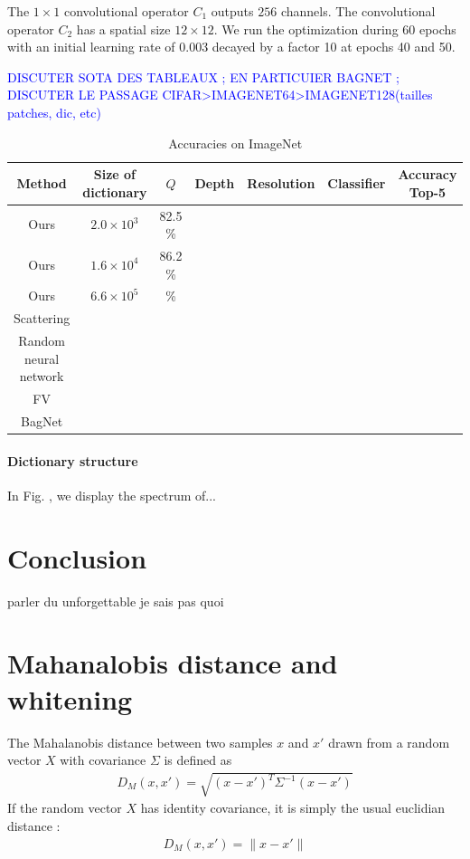 \documentclass{article}
\newcommand{\Edouard}[1]{\textcolor{blue}{#1}}
\begin{document}
The $1 \times 1$ convolutional operator $C_1$ outputs $256$ channels.
The convolutional operator $C_2$ has a spatial size $12 \times 12$.
We run the optimization during 60 epochs with an initial learning rate of 0.003 decayed by a factor 10 at epochs 40 and 50.

\Edouard{DISCUTER SOTA DES TABLEAUX ; EN PARTICUIER BAGNET ; DISCUTER LE PASSAGE CIFAR>IMAGENET64>IMAGENET128(tailles patches, dic, etc)}


\begin{table}[h]
  \caption{Accuracies on ImageNet}
  \label{accuracy}
  \centering
  \begin{tabular}{|c|c|c|c|c|c|c|}
    \hline 
    Method&Size of dictionary&$Q$&Depth &Resolution&Classifier& Accuracy Top-5\\
    \hline 
    \hline
    Ours&$2.0\times 10^3$ & 82.5 \%\\
    \hline 
    Ours&$1.6\times10^4$ & 86.2 \%\\
    \hline 
    Ours&$6.6\times 10^5$  & \%\\
    \hline
    Scattering\\
    \hline 
    Random neural network\\
    \hline
    FV\\
    \hline
    BagNet\\
    \hline
  \end{tabular}
\end{table}


\paragraph{Dictionary structure} In Fig. \label{spectrum}, we display the spectrum of...


\section{Conclusion}
parler du unforgettable je sais pas quoi




{}

\newpage

\appendix

\section{Mahanalobis distance and whitening}

The Mahalanobis distance \citep{chandra1936generalised, mclachlan1999mahalanobis} between two samples $x$ and $x'$ drawn from a random vector $X$ with covariance $\Sigma$ is defined as  
\begin{align*} D_M (x, x' ) =  \sqrt{ (x - x')^T \Sigma^{-1} (x - x')} \end{align*}
If the random vector $X$ has identity covariance, it is simply the usual euclidian distance :
\begin{align*} D_M (x, x' ) =  \| x - x' \| \end{align*}
\end{document}
